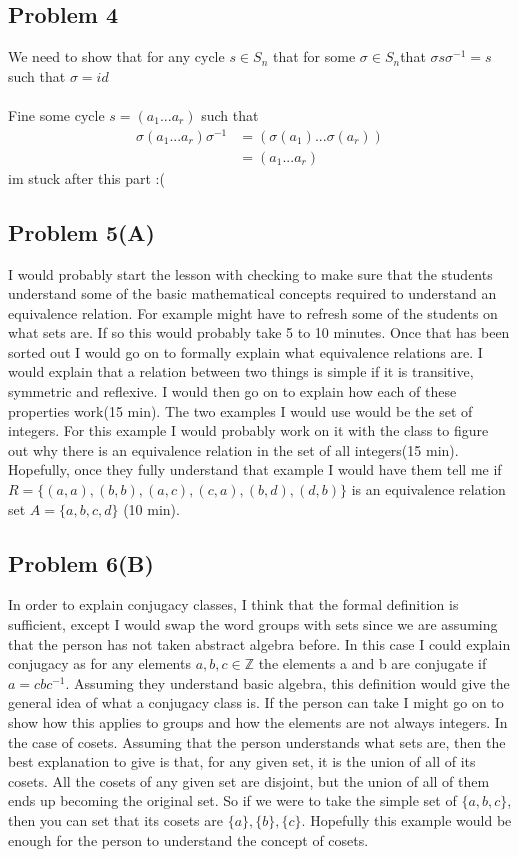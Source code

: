 \documentclass[12pt]{article}
\newcommand{\Z}{\mathbb{Z}}
\begin{document}
\subsection*{Problem 4}
We need to show that for any cycle  $s \in S_n$ that for some $\sigma \in S_n$that $\sigma s \sigma^{-1} = s$ such that $\sigma	 = id$\\\\
Fine some cycle $s = (a_1...a_r)$ such that
\begin{align*}
\sigma(a_1...a_r)\sigma^{-1} &= (\sigma(a_1)...\sigma(a_r))\\
&= (a_1...a_r)
\end{align*} 
im stuck after this part :(
\subsection*{Problem 5(A)}
I would probably start the lesson with checking to make sure that the students understand some of the basic mathematical concepts required to understand an equivalence relation. For example might have to refresh some of the students on what sets are. If so this would probably take 5 to 10 minutes. Once that has been sorted out I would go on to formally explain what equivalence relations are. I would explain that a relation between two things is simple if it is transitive, symmetric and reflexive. I would then go on to explain how each of these properties work(15 min). The two examples I would use would be the set of integers. For this example I would probably work on it with the class to figure out why there is an equivalence relation in the set of all integers(15 min). Hopefully, once they fully understand that example I would have them tell me if $R=\{(a,a),(b,b),(a,c),(c,a),(b,d),(d,b)\}$ is an equivalence relation set $A=\{a,b,c,d\}$ (10 min).

\subsection*{Problem 6(B)}
In order to explain conjugacy classes, I think that the formal definition is sufficient, except I would swap the word groups with sets since we are assuming that the person has not taken abstract algebra before. In this case I could explain conjugacy as for any elements $a,b,c \in \Z$ the elements a and b are conjugate if $a=cbc^{-1}$. Assuming they understand basic algebra, this definition would give the general idea of what a conjugacy class is. If the person can take I might go on to show how this applies to groups and how the elements are not always integers. In the case of cosets. Assuming that the person understands what sets are, then the best explanation to give is that, for any given set, it is the union of all of its cosets. All the cosets of any given set are disjoint, but the union of all of them ends up becoming the original set. So if we were to take the simple set of $\{a,b,c\}$, then you can set that its cosets are $\{a\},\{b\},\{c\}$. Hopefully this example would be enough for the person to understand the concept of cosets.
\end{document}
